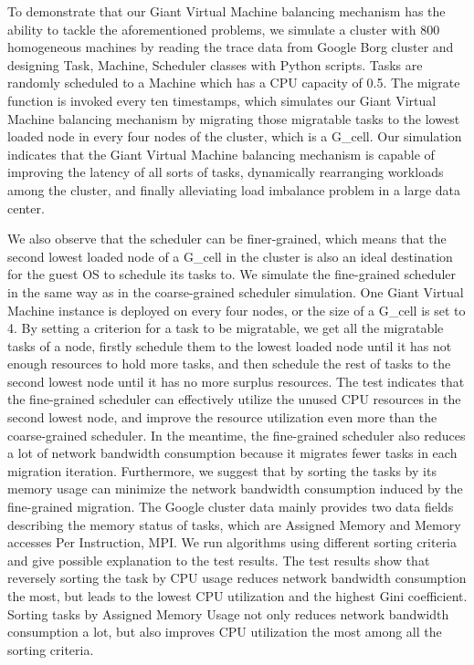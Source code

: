 \begin{bigabstract}
To demonstrate that our Giant Virtual Machine balancing mechanism has the ability to tackle the aforementioned problems, we simulate a cluster with 800 homogeneous machines by reading the trace data from Google Borg cluster and designing Task, Machine, Scheduler classes with Python scripts. Tasks are randomly scheduled to a Machine which has a CPU capacity of 0.5. The migrate function is invoked every ten timestamps, which simulates our Giant Virtual Machine balancing mechanism by migrating those migratable tasks to the lowest loaded node in every four nodes of the cluster, which is a G\_cell. Our simulation indicates that the Giant Virtual Machine balancing mechanism is capable of improving the latency of all sorts of tasks, dynamically rearranging workloads among the cluster, and finally alleviating load imbalance problem in a large data center.

We also observe that the scheduler can be finer-grained, which means that the second lowest loaded node of a G\_cell in the cluster is also an ideal destination for the guest OS to schedule its tasks to. We simulate the fine-grained scheduler in the same way as in the coarse-grained scheduler simulation. One Giant Virtual Machine instance is deployed on every four nodes, or the size of a G\_cell is set to 4. By setting a criterion for a task to be migratable, we get all the migratable tasks of a node, firstly schedule them to the lowest loaded node until it has not enough resources to hold more tasks, and then schedule the rest of tasks to the second lowest node until it has no more surplus resources. The test indicates that the fine-grained scheduler can effectively utilize the unused CPU resources in the second lowest node, and improve the resource utilization even more than the coarse-grained scheduler. In the meantime, the fine-grained scheduler also reduces a lot of network bandwidth consumption because it migrates fewer tasks in each migration iteration. Furthermore, we suggest that by sorting the tasks by its memory usage can minimize the network bandwidth consumption induced by the fine-grained migration. The Google cluster data mainly provides two data fields describing the memory status of tasks, which are Assigned Memory and Memory accesses Per Instruction, MPI. We run algorithms using different sorting criteria and give possible explanation to the test results. The test results show that reversely sorting the task by CPU usage reduces network bandwidth consumption the most, but leads to the lowest CPU utilization and the highest Gini coefficient. Sorting tasks by Assigned Memory Usage not only reduces network bandwidth consumption a lot, but also improves CPU utilization the most among all the sorting criteria. 


\end{bigabstract}